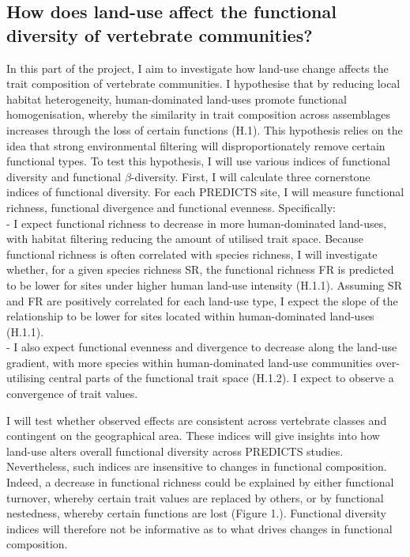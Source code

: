 \subsection{How does land-use affect the functional diversity of vertebrate communities?}

In this part of the project, I aim to investigate how land-use change affects the trait composition of vertebrate communities. I hypothesise that by reducing local habitat heterogeneity, human-dominated land-uses promote functional homogenisation, whereby the similarity in trait composition across assemblages increases through the loss of certain functions (H.1). This hypothesis relies on the idea that strong environmental filtering will disproportionately remove certain functional types. To test this hypothesis, I will use various indices of functional diversity and functional $\beta$-diversity.
First, I will calculate three cornerstone indices of functional diversity. For each PREDICTS site, I will measure functional richness, functional divergence and functional evenness. Specifically:\\
-	I expect functional richness to decrease in more human-dominated land-uses, with habitat filtering reducing the amount of utilised trait space. Because functional richness is often correlated with species richness, I will investigate whether, for a given species richness SR, the functional richness FR is predicted to be lower for sites under higher human land-use intensity (H.1.1). Assuming SR and FR are positively correlated for each land-use type, I expect the slope of the relationship to be lower for sites located within human-dominated land-uses (H.1.1). \\
-	I also expect functional evenness and divergence to decrease along the land-use gradient, with more species within human-dominated land-use communities over-utilising central parts of the functional trait space (H.1.2). I expect to observe a convergence of trait values. 

I will test whether observed effects are consistent across vertebrate classes and contingent on the geographical area. These indices will give insights into how land-use alters overall functional diversity across PREDICTS studies. Nevertheless, such indices are insensitive to changes in functional composition. Indeed, a decrease in functional richness could be explained by either functional turnover, whereby certain trait values are replaced by others, or by functional nestedness, whereby certain functions are lost (Figure 1.). Functional diversity indices will therefore not be informative as to what drives changes in functional composition. 

